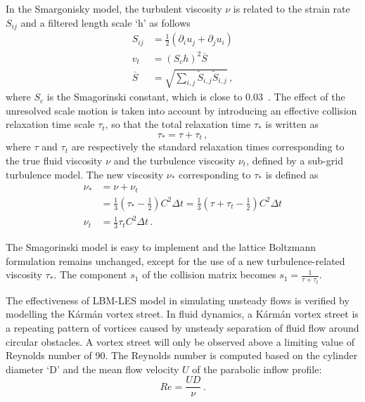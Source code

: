 In the Smargonisky model, the turbulent viscosity $\nu$ is related to the 
strain 
rate $S_{ij}$ and a filtered length scale `h' as follows
%
\begin{align}
S_{ij} & = \frac{1}{2}(\partial_i u_j + \partial_j u_i) \\
\mathit{v}_{\mathit{t}} & = (\mathit{S}_{c}\mathit{h})^{2}\overline{S} \\
\overline{S} & =  
\sqrt{\sum\limits_{\mathit{i,j}}{\tilde{S}_{\mathit{i,j}}\tilde{S}_{\mathit{i,j}}}}\,,
\end{align}
%
\noindent where $\mathit{S}_{c}$ is the Smagorinski constant, which is close 
to 0.03~\citep{yu2005}. 
%
The effect of the unresolved scale motion is taken into account by introducing 
an effective collision relaxation time scale $\tau_{t}$, so that the total 
relaxation time $\tau_{*}$ is written as
%
\begin{equation}
\tau_{*}=\tau + \tau_{t}\,,
\end{equation} 
%
\noindent where $\tau$ and $\tau_{t}$ are respectively the standard relaxation 
times 
corresponding to the true fluid viscosity $\nu$ and the turbulence 
viscosity $\nu_{\mathit{t}}$, defined by a sub-grid turbulence model. 
The new viscosity $\nu_{*}$ corresponding to $\tau_{*}$ is defined as
%
\begin{align}
\nu_{*} & 
=\nu+\nu_{\mathit{t}} \nonumber \\
	& =\frac{1}{3}(\tau_{*}-\frac{1}{2})
\mathit{C}^{2} \Delta \mathit{t} 
=\frac{1}{3}(\tau+\tau_{t}-\frac{1}{2})\mathit{C}^{2} \Delta \mathit{t}  \\
\nu_{\mathit{t}} & =\frac{1}{3}\tau_{\mathit{t}}\mathit{C}^{2} \Delta 
\textit{t} \,.
\end{align} 

The Smagorinski model is easy to implement and the lattice Boltzmann 
formulation remains unchanged, except for the use of a new turbulence-related 
viscosity $\tau_{*}$. The component $s_1$ of the collision matrix becomes $s_1 
= \frac{1}{\tau+\tau_t}$.

The effectiveness of LBM-LES model in simulating unsteady flows is verified by 
modelling the K\'{a}rm\'{a}n vortex street. In fluid dynamics, a K\'{a}rm\'{a}n 
vortex street is a repeating pattern of vortices caused by unsteady separation 
of fluid flow around circular obstacles. A vortex street will only be observed 
above a limiting value of Reynolds number of 90. The Reynolds number 
is computed based on the cylinder diameter `D' and the mean flow velocity $U$ 
of the parabolic inflow profile:
%
\begin{equation}
\label{eq:reynolds}
Re=\frac{UD}{\nu}\,.
\end{equation}

